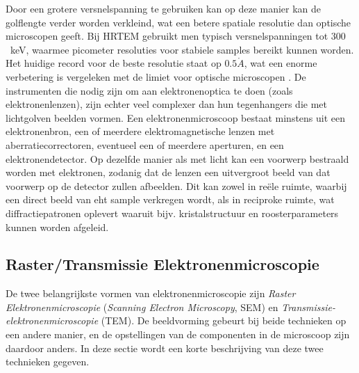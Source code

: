 \documentclass[we,twoside,openright,a4paper,11pt]{uantwerpenbamathesis}
\begin{document}
Door een grotere versnelspanning te gebruiken kan op deze manier kan de golflengte verder worden verkleind, wat een betere spatiale resolutie dan optische microscopen geeft. Bij HRTEM gebruikt men typisch versnelspanningen tot $300$~keV, waarmee picometer resoluties voor stabiele samples bereikt kunnen worden. Het huidige record voor de beste resolutie staat op $0.5\mathring{A}$, wat een enorme verbetering is vergeleken met de limiet voor optische microscopen \cite{Jiang2018Ptychography}. De instrumenten die nodig zijn om aan elektronenoptica te doen (zoals elektronenlenzen), zijn echter veel complexer dan hun tegenhangers die met lichtgolven beelden vormen. Een elektronenmicroscoop bestaat minstens uit een elektronenbron, een of meerdere elektromagnetische lenzen met aberratiecorrectoren, eventueel een of meerdere aperturen, en een elektronendetector. Op dezelfde manier als met licht kan een voorwerp bestraald worden met elektronen, zodanig dat de lenzen een uitvergroot beeld van dat voorwerp op de detector zullen afbeelden. Dit kan zowel in reële ruimte, waarbij een direct beeld van eht sample verkregen wordt, als in reciproke ruimte, wat diffractiepatronen oplevert waaruit bijv. kristalstructuur en roosterparameters kunnen worden afgeleid.

\subsection{Raster/Transmissie Elektronenmicroscopie}
De twee belangrijkste vormen van elektronenmicroscopie zijn \textit{Raster Elektronenmicroscopie} (\textit{Scanning Electron Microscopy}, SEM) en \textit{Transmissie-elektronenmicroscopie} (TEM). De beeldvorming gebeurt bij beide technieken op een andere manier, en de opstellingen van de componenten in de microscoop zijn daardoor anders. In deze sectie wordt een korte beschrijving van deze twee technieken gegeven.\\
\end{document}
